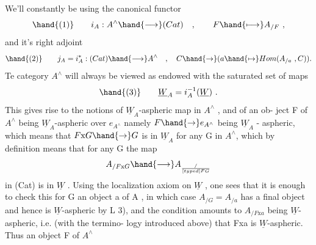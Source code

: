 We'll constantly be using the canonical functor
\[ \hand{(1)} \qquad i_A : A^{\wedge} \hand{\longrightarrow} (Cat) \quad , \qquad F \hand{\longmapsto} A_{/F} \ , \]
and it's  right adjoint
\[ \hand{(2)} \qquad j_A = i_A^{*} : (Cat) \hand{\longrightarrow} A^{\wedge} \quad , \quad C \hand{\to} (a \hand{\mapsto} Hom(A_{/a} \ , C)). \]
Te category $A^{\wedge}$ will always be viewed as endowed with the saturated set
of maps
\[ \hand{(3)} \qquad \underline{W}_A = i_A^{-1}(\underline{W}) \ . \]
This gives rise to the notions of $\underline{W}_A$-aspheric map in $A^{\wedge}$ , and of an ob-%
ject  F of $A^{\wedge}$ being $\underline{W}_A$-aspheric over $e_{A^{\wedge}}$ namely $F \hand{\to} e_{A^{\wedge}}$ being $\underline{W}_A$ -
aspheric,  which means that $F\mathrm{x}G \hand{\to} G$ is in $\underline{W}_A$ for any
G in $A^{\wedge}$, which by definition means that for any G the map
\[ A_{/F\mathrm{x}G} \hand{\longrightarrow} A_{/\over[typed]{F}{G}} \]
in (Cat) is in $\underline{W}$ . Using the localization axiom on $\underline{W}$ ,  one sees
that it is enough to check this for G an object a of A , in which case
$A_{/G} = A_{/a}$ has a final object and hence is $\underline{W}$-aspheric by L 3), and the
condition amounts to $A_{/F\mathrm{x}a}$ being $\underline{W}$-aspheric, i.e. (with the termino-%
logy introduced above) that Fxa is $\underline{W}$-aspheric. Thus an object F of $A^{\wedge}$

